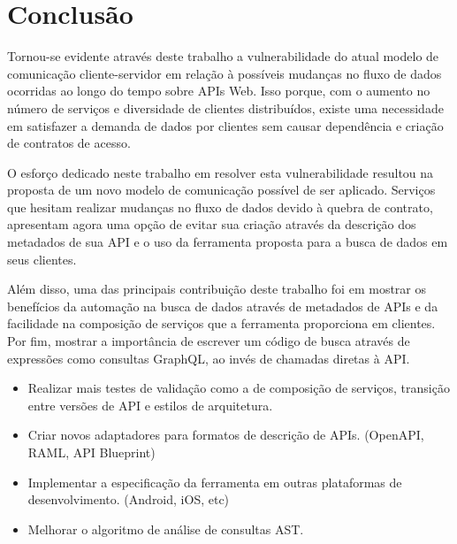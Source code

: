 \chapter{Conclusão}

Tornou-se evidente através deste trabalho a vulnerabilidade do atual modelo de comunicação cliente-servidor em relação à possíveis mudanças no fluxo de dados ocorridas ao longo do tempo sobre APIs Web. Isso porque, com o aumento no número de serviços e diversidade de clientes distribuídos, existe uma necessidade em satisfazer a demanda de dados por clientes sem causar dependência e criação de contratos de acesso.

O esforço dedicado neste trabalho em resolver esta vulnerabilidade resultou na proposta de um novo modelo de comunicação possível de ser aplicado. Serviços que hesitam realizar mudanças no fluxo de dados devido à quebra de contrato, apresentam agora uma opção de evitar sua criação através da descrição dos metadados de sua API e o uso da ferramenta proposta para a busca de dados em seus clientes.

Além disso, uma das principais contribuição deste trabalho foi em mostrar os benefícios da automação na busca de dados através de metadados de APIs e da facilidade na composição de serviços que a ferramenta proporciona em clientes. Por fim, mostrar a importância de escrever um código de busca através de expressões como consultas GraphQL, ao invés de chamadas diretas à API.



\begin{itemize}
\item Realizar mais testes de validação como a de composição de serviços, transição entre versões de API e estilos de arquitetura.
\item Criar novos adaptadores para formatos de descrição de APIs. (OpenAPI, RAML, API Blueprint)
\item Implementar a especificação da ferramenta em outras plataformas de desenvolvimento. (Android, iOS, etc)
\item Melhorar o algoritmo de análise de consultas AST.
\end{itemize}
